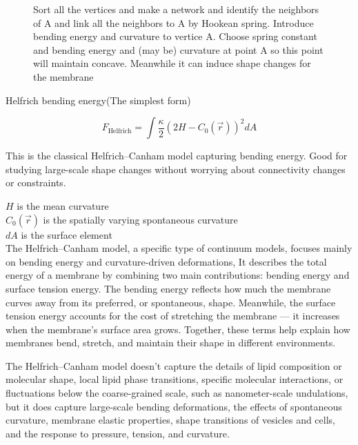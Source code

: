 \documentclass[12pt]{article}
\begin{document}
\begin{flushleft}
\begin{figure}[!ht]
  \centering
  \caption{Sort all the vertices and make a network and identify the neighbors of A and link all the neighbors to A by Hookean spring. Introduce bending energy and curvature to vertice A.
Choose spring constant and bending energy and (may be) curvature at point A so this point will maintain concave. Meanwhile it can induce shape changes for the membrane}
\end{figure}

 

Helfrich bending energy(The simplest form)

\vspace{-1em} 


\begin{equation}
F_{\text{Helfrich}} = \int \frac{\kappa}{2} \left( 2H - C_0(\vec{r}) \right)^2 dA
\end{equation}

This is the classical Helfrich–Canham model capturing bending energy. Good for studying large-scale shape changes without worrying about connectivity changes or constraints.


\( H \) is the mean curvature\\
\( C_0(\vec{r}) \) is the spatially varying spontaneous curvature\\
\( dA \) is the surface element\\

The Helfrich–Canham model, a specific type of continuum models, focuses mainly on bending energy and curvature-driven deformations, It describes the total energy of a membrane by combining two main contributions: bending energy and surface tension energy. The bending energy reflects how much the membrane curves away from its preferred, or spontaneous, shape. Meanwhile, the surface tension energy accounts for the cost of stretching the membrane — it increases when the membrane's surface area grows. Together, these terms help explain how membranes bend, stretch, and maintain their shape in different environments.

The Helfrich–Canham model doesn't capture the details of lipid composition or molecular shape, local lipid phase transitions, specific molecular interactions, or fluctuations below the coarse-grained scale, such as nanometer-scale undulations, but it does capture large-scale bending deformations, the effects of spontaneous curvature, membrane elastic properties, shape transitions of vesicles and cells, and the response to pressure, tension, and curvature.



\end{flushleft}
\end{document}
